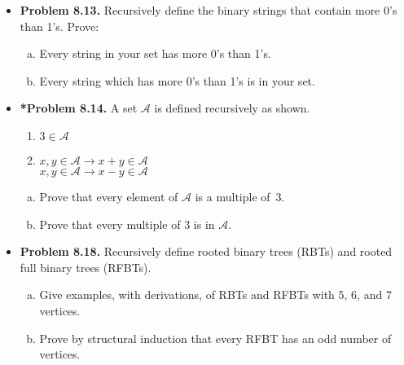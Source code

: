 \documentclass[11pt]{article}
\def\imp{\rightarrow}
\begin{document}
\begin{itemize}
\vspace{0.1in}

\item \textbf{Problem 8.13.}
Recursively define the binary strings that contain more 0's than 1's.
Prove:
\begin{enumerate}[(a)]
\item Every string in your set has more 0's than 1's.
\item Every string which has more 0's than 1's is in your set.
\end{enumerate}

\vspace{0.1in}

\item \textbf{*Problem 8.14.}
A set $\mathcal{A}$ is defined recursively as shown.
\begin{enumerate}[(1)]
\item $3\in\mathcal{A}$
\item $x,y\in\mathcal{A}\imp x+y\in\mathcal{A}$ \\
  $x,y\in\mathcal{A}\imp x-y\in\mathcal{A}$
\end{enumerate}
\begin{enumerate}[(a)]
\item Prove that every element of $\mathcal{A}$ is a multiple of~3.

\item Prove that every multiple of 3 is in $\mathcal{A}$.
\end{enumerate}

\vspace{0.1in}

\item \textbf{Problem 8.18.}
Recursively define rooted binary trees (RBTs) and rooted full binary trees (RFBTs).
\begin{enumerate}[(a)]
\item Give examples, with derivations, of RBTs and RFBTs with 5, 6, and 7 vertices.
\item Prove by structural induction that every RFBT has an odd number of vertices.
\end{enumerate}

\end{itemize}
\end{document}
